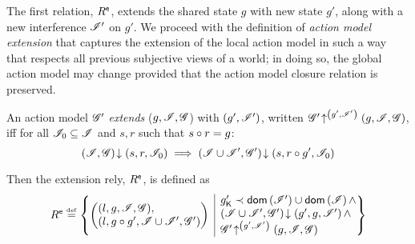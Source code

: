 The first relation, $R^{\textsf{e}}$, extends the shared state $g$ with new state $g'$, along with a new interference $\mathscr{I}'$ on $g'$. We proceed with the definition of \emph{action model extension} that captures the extension of the local action model in such a way that respects all previous subjective views of a world; in doing so, the global action model may change provided that the action model closure relation is preserved.
%
%
\begin{definition}\label{def:amodExtension}
An action model $\mathscr{G}'$ \emph{extends} ($g, \mathscr{I}, \mathscr{G}$) with
$(g', \mathscr{I}')$, written
$\mathscr{G}' \!\uparrow^{\left(g', \mathscr{I}'\right)} \left(g, \mathscr{I}, \mathscr{G}\right)$, iff for all
$\mathscr{I}_0 \subseteq \mathscr{I}$ and $s, r$ such that $s \circ r = g$:
\[
\left(\mathscr{I}, \mathscr{G}\right) \!\downarrow \left(s, r, \mathscr{I}_0\right) \implies \left(\mathscr{I} \cup \mathscr{I}', \mathscr{G}'\right) \!\downarrow \left(s, r\circ g', \mathscr{I}_0\right)
\]
\end{definition}
%
%
Then the extension rely, $R^{\textsf{e}}$, is defined as
%
\[
  \extendR \eqdef
  \left\{
  \begin{array}{@{} l @{\hspace{5pt}} | @{\hspace{5pt}} l @{}}
    \left(
    \begin{array}{@{} l @{}}
      (l , g, \lmod, \gmod),\\
      (l, g \composeL g', \lmod \cup \lmod', \gmod')
    \end{array}
    \right)
    &
    \begin{array}{@{} l @{}}
      \capPart{g'} \containedIn \dom{\lmod'} \cup \dom{\lmod} \land \\
      \extendsAM{\lmod \cup \lmod', \gmod'}{g'}{g}{\lmod'} \land \\
      \expandsAM{\gmod'}{g'}{\lmod'}{g}{\lmod}{\gmod}
    \end{array}
  \end{array}
  \right\}
\]


